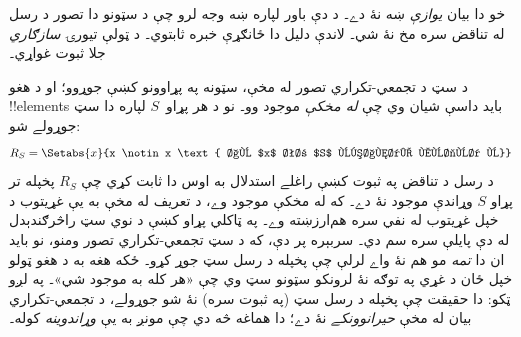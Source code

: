 \documentclass[../../../include/open-logic-section]{subfiles}
\begin{document}
خو دا بيان \emph{يوازې} ښه نۀ دے۔ د دې باور لپاره ښه وجه
لرو چې د سټونو دا تصور د رسل له تناقض سره مخ نۀ شي۔
لاندې دليل دا ځانګړې خبره ثابتوي۔ د ټولې تيورۍ
\emph{سازګاري} جلا ثبوت غواړي۔

د سټ د تجمعي-تکراري تصور له مخې، سټونه په پړاوونو کښې
جوړوو؛ او د هغو !!{element}s بايد داسې شيان وي چې
\emph{له مخکې} موجود وو۔ نو د هر پړاو~$S$ لپاره دا سټ جوړولے شو:
\[
  R_S = \Setabs{x}{x \notin x \text{ او $x$ تر $S$ وړاندې موجود و}}
\]
د رسل د تناقض په ثبوت کښې راغلے استدلال به اوس دا ثابت کړي
چې $R_S$ پخپله تر پړاو $S$ وړاندې موجود نۀ دے۔ که له مخکې
موجود وے، د تعريف له مخې به يې غړيتوب د خپل غړيتوب له نفي
سره هم‌ارزښته وے۔ په ټاکلي پړاو کښې د نوي سټ راڅرګندېدل له
دې پايلې سره سم دي۔ سربېره پر دې، که د سټ تجمعي-تکراري تصور ومنو، نو
بايد ان دا \emph{تمه} مو هم نۀ واے لرلې چې پخپله د رسل سټ
جوړ کړو۔ ځکه هغه به د هغو ټولو خپل ځان د غړي په توګه نۀ
لرونکو سټونو سټ وي چې «هر کله به موجود شي»۔ په لږو ټکو:
دا حقيقت چې پخپله د رسل سټ (په ثبوت سره) نۀ شو جوړولے، د
تجمعي-تکراري بيان له مخې \emph{حيرانوونکے} نۀ دے؛ دا هماغه
څه دي چې مونږ به يې \emph{وړاندوينه} کوله۔

%

\end{document}
